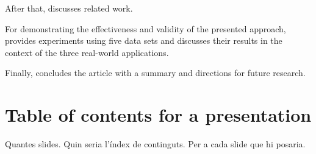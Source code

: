 \documentclass[a4paper]{article}
\begin{document}
After that, discusses related work. 
\vskip 0.3cm

For demonstrating the effectiveness and validity of the presented approach, provides experiments using five data sets and discusses their results in the context of the three real-world applications. 
\vskip 0.3cm

Finally, concludes the article with a summary and directions for future research.

\section*{Table of contents for a presentation}
Quantes slides. Quin seria l'índex de continguts.
Per a cada slide que hi posaria.
\end{document}
